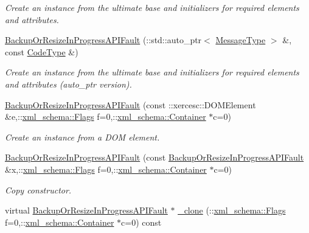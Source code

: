 \begin{DoxyCompactItemize}
\begin{DoxyCompactList}\small\item\em Create an instance from the ultimate base and initializers for required elements and attributes. \item\end{DoxyCompactList}\item 
\hyperlink{classopenstack_1_1xml_1_1BackupOrResizeInProgressAPIFault_a5af928ff759844f85290f3708468643e}{BackupOrResizeInProgressAPIFault} (::std::auto\_\-ptr$<$ \hyperlink{classopenstack_1_1xml_1_1CloudServersAPIFault_aff7b9d2067747fa033a0ea4408011af6}{MessageType} $>$ \&, const \hyperlink{classopenstack_1_1xml_1_1CloudServersAPIFault_aa9f350c9dba08ae375b2a61568551550}{CodeType} \&)
\begin{DoxyCompactList}\small\item\em Create an instance from the ultimate base and initializers for required elements and attributes (auto\_\-ptr version). \item\end{DoxyCompactList}\item 
\hyperlink{classopenstack_1_1xml_1_1BackupOrResizeInProgressAPIFault_a39817f7719110be29916d4991b118550}{BackupOrResizeInProgressAPIFault} (const ::xercesc::DOMElement \&e,::\hyperlink{namespacexml__schema_affb4c227cbd9aa7453dd1dc5a1401943}{xml\_\-schema::Flags} f=0,::\hyperlink{namespacexml__schema_a333dea2213742aea47a37532dec4ec27}{xml\_\-schema::Container} $\ast$c=0)
\begin{DoxyCompactList}\small\item\em Create an instance from a DOM element. \item\end{DoxyCompactList}\item 
\hyperlink{classopenstack_1_1xml_1_1BackupOrResizeInProgressAPIFault_a63b2f48b0f9f7e9bac20b81058efec82}{BackupOrResizeInProgressAPIFault} (const \hyperlink{classopenstack_1_1xml_1_1BackupOrResizeInProgressAPIFault}{BackupOrResizeInProgressAPIFault} \&x,::\hyperlink{namespacexml__schema_affb4c227cbd9aa7453dd1dc5a1401943}{xml\_\-schema::Flags} f=0,::\hyperlink{namespacexml__schema_a333dea2213742aea47a37532dec4ec27}{xml\_\-schema::Container} $\ast$c=0)
\begin{DoxyCompactList}\small\item\em Copy constructor. \item\end{DoxyCompactList}\item 
virtual \hyperlink{classopenstack_1_1xml_1_1BackupOrResizeInProgressAPIFault}{BackupOrResizeInProgressAPIFault} $\ast$ \hyperlink{classopenstack_1_1xml_1_1BackupOrResizeInProgressAPIFault_ab709c557f8c3a20095d62373697668ed}{\_\-clone} (::\hyperlink{namespacexml__schema_affb4c227cbd9aa7453dd1dc5a1401943}{xml\_\-schema::Flags} f=0,::\hyperlink{namespacexml__schema_a333dea2213742aea47a37532dec4ec27}{xml\_\-schema::Container} $\ast$c=0) const 

\end{DoxyCompactItemize}
